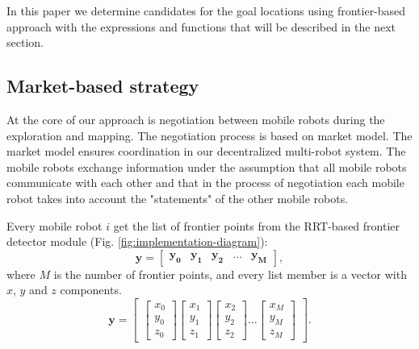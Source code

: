 \documentclass[letterpaper, 10 pt, conference]{ieeeconf}  %
\begin{document}
In this paper we determine candidates for the goal locations using frontier-based approach with the expressions and functions that will be described in the next section. 

\subsection{Market-based strategy} 

At the core of our approach is negotiation between mobile robots during the exploration and mapping. The negotiation process is based on market model. The market model ensures coordination in our decentralized multi-robot system. The mobile robots exchange information under the assumption that all mobile robots communicate with each other and that in the process of negotiation each mobile robot takes into account the "statements" of the other mobile robots.

Every mobile robot $i$ get the list of frontier points from the RRT-based frontier detector module (Fig. \ref{fig:implementation-diagram}): 
\begin{equation}
   \boldsymbol{y}=\begin{bmatrix}
    \boldsymbol{y_{0}} & \boldsymbol{y_{1}} & \boldsymbol{y_{2}} & \hdots & \boldsymbol{y_{M}}
\end{bmatrix},
\end{equation}
where $M$ is  the number of frontier points, and every list member is a vector with $x$, $y$ and $z$ components. 
\begin{equation}
   \boldsymbol{y}=\begin{bmatrix}
   \begin{bmatrix}
           x_{0} \\
           y_{0} \\
           z_{0}
   \end{bmatrix}
    \begin{bmatrix}
         x_{1} \\
         y_{1} \\
         z_{1}
    \end{bmatrix}
    \begin{bmatrix}
         x_{2} \\
         y_{2} \\
         z_{2}
    \end{bmatrix}
    \hdots
    \begin{bmatrix}
         x_{M} \\
         y_{M} \\
         z_{M}
    \end{bmatrix}
\end{bmatrix}.
\end{equation}
\end{document}
